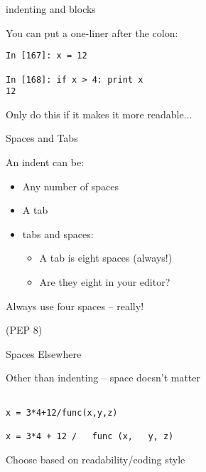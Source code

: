 \documentclass{beamer}
\begin{document}
\begin{frame}[fragile]{indenting and blocks}

{\Large  You can put a one-liner after the colon:}

\vfill
\begin{verbatim}
In [167]: x = 12

In [168]: if x > 4: print x
12
\end{verbatim}

\vfill
{\Large Only do this if it makes it more readable...}

\end{frame}


\begin{frame}[fragile]{Spaces and Tabs}

{\Large  An indent can be:}
\begin{itemize}
  \item Any number of spaces
  \item A tab
  \item tabs and spaces:
    \begin{itemize}
      \item A tab is eight spaces (always!)
      \item Are they eight in your editor?
    \end{itemize}
\end{itemize}

\vfill
{\LARGE Always use four spaces -- really!}

\vfill
(PEP 8)

\end{frame}


\begin{frame}[fragile]{Spaces Elsewhere}

{\Large  Other than indenting -- space doesn't matter}

\vfill
\begin{verbatim}

x = 3*4+12/func(x,y,z)

x = 3*4 + 12 /   func (x,   y, z) 

\end{verbatim}

\vfill
{\Large Choose based on readability/coding style}

\vfill
{}

\end{frame}
\end{document}
